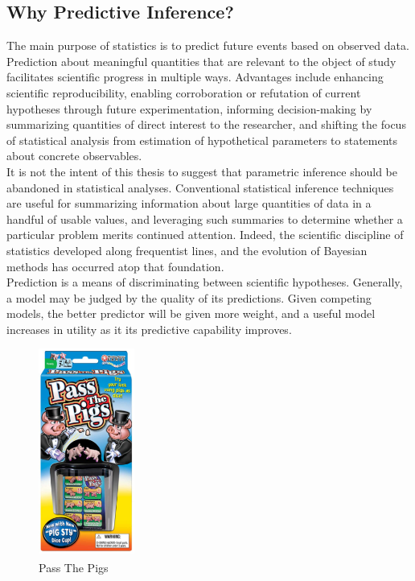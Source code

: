 \documentclass[12pt, a4paper]{article}
\begin{document}
  \subsection{Why Predictive Inference?}

The main purpose of statistics is to predict future events based on observed data.  Prediction about meaningful quantities that are relevant to the object of study facilitates scientific progress in multiple ways.  Advantages include enhancing scientific reproducibility, enabling corroboration or refutation of current hypotheses through future experimentation, informing decision-making by summarizing quantities of direct interest to the researcher, and shifting the focus of statistical analysis from estimation of hypothetical parameters to statements about concrete observables.\\

\noindent It is not the intent of this thesis to suggest that parametric inference should be abandoned in statistical analyses.  Conventional statistical inference techniques are useful for summarizing information about large quantities of data in a handful of usable values, and leveraging such summaries to determine whether a particular problem merits continued attention.  Indeed, the scientific discipline of statistics developed along frequentist lines, and the evolution of Bayesian methods has occurred atop that foundation.\\

\noindent Prediction is a means of discriminating between scientific hypotheses.  Generally, a model may be judged by the quality of its predictions.  Given competing models, the better predictor will be given more weight, and a useful model increases in utility as it its predictive capability improves.

\begin{figure}
  \begin{center}
    \includegraphics[width=0.28\textwidth]{./Graphics/PassThePigs/PtPBox}
  \end{center}
  \caption{Pass The Pigs\textsuperscript{\circledR}}
\end{figure}
\end{document}
